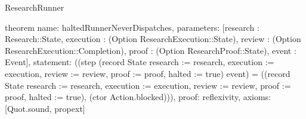 \begin{lexlean}{ResearchRunner}
\begin{semanticmodule}
theorem{
  name: haltedRunnerNeverDispatches,
  parameters: [research : Research::State, execution : (Option ResearchExecution::State), review : (Option ResearchExecution::Completion), proof : (Option ResearchProof::State), event : Event],
  statement: ((step (record State {research := research, execution := execution, review := review, proof := proof, halted := true}) event) = ((record State {research := research, execution := execution, review := review, proof := proof, halted := true}), (ctor Action.blocked))),
  proof: reflexivity{},
  axioms: [Quot.sound, propext]
}
\end{semanticmodule}
\end{lexlean}
